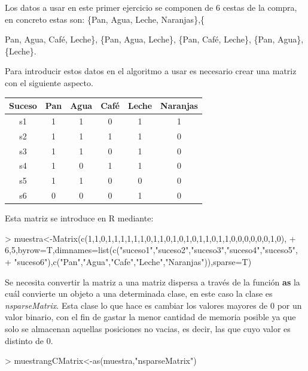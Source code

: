 \documentclass [a4paper] {article}
\begin{document}
Los datos a usar en este primer ejercicio se componen de 6 cestas de la compra, en concreto
estas son: \{Pan, Agua, Leche, Naranjas\},\{{Pan, Agua, Café, Leche\}, \{Pan, Agua, Leche\}, 
\{Pan, Café, Leche\}, \{Pan, Agua\}, \{Leche\}.

\bigskip
Para introducir estos datos en el algoritmo a usar es necesario crear una matriz con el siguiente
aspecto.
\begin{table}[H]
\begin{center}
\begin{tabular}{|c|c|c|c|c|c|}
\hline
Suceso & Pan & Agua & Café & Leche & Naranjas \\
\hline \hline
s1 & 1 & 1 & 0 & 1 & 1 \\ \hline
s2 & 1 & 1 & 1 & 1 & 0 \\ \hline
s3 & 1 & 1 & 0 & 1 & 0 \\ \hline
s4 & 1 & 0 & 1 & 1 & 0 \\ \hline
s5 & 1 & 1 & 0 & 0 & 0 \\ \hline
s6 & 0 & 0 & 0 & 1 & 0 \\ \hline
\end{tabular}
\end{center}
\end{table}

\bigskip
Esta matriz se introduce en R mediante:
\begin{Schunk}
\begin{Sinput}
> muestra<-Matrix(c(1,1,0,1,1,1,1,1,1,0,1,1,0,1,0,1,0,1,1,0,1,1,0,0,0,0,0,0,1,0),
+ 6,5,byrow=T,dimnames=list(c("suceso1","suceso2","suceso3","suceso4","suceso5",
+ "suceso6"),c("Pan","Agua","Cafe","Leche","Naranjas")),sparse=T)
\end{Sinput}
\end{Schunk}

\bigskip
Se necesita convertir la matriz a una matriz dispersa a través de la función \textbf{as} la cuál convierte un objeto a una determinada
clase, en este caso la clase es \textit{nsparseMatrix}. Esta clase lo que hace es cambiar los valores mayores de 0 por un valor binario, 
con el fin de gastar la menor cantidad de memoria posible ya que solo se almacenan aquellas posiciones no vacias, es decir, las que cuyo
valor es distinto de 0.
\begin{Schunk}
\begin{Sinput}
> muestrangCMatrix<-as(muestra,"nsparseMatrix")
\end{Sinput}
\end{Schunk}

}
\end{document}
